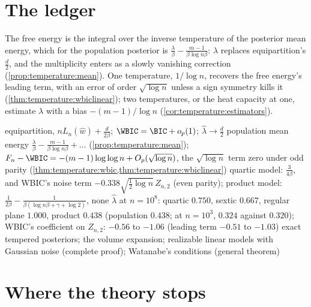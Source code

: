 \begin{refsection}
\section{The ledger}\label{sec:temperature:ledger}

The free energy is the integral over the inverse temperature of the posterior mean energy, which for the population posterior is $\frac\lambda\beta-\frac{m-1}{\beta\log n\beta}$: $\lambda$ replaces equipartition's $\frac d2$, and the multiplicity enters as a slowly vanishing correction (\cref{prop:temperature:mean}). One temperature, $1/\log n$, recovers the free energy's leading term, with an error of order $\sqrt{\log n}$ unless a sign symmetry kills it (\cref{thm:temperature:wbiclinear}); two temperatures, or the heat capacity at one, estimate $\lambda$ with a bias $-(m-1)/\log n$ (\cref{cor:temperature:estimators}).

{equipartition, $nL_n(\hat w)+\frac{d}{2\beta}$; $\WBIC=\BIC+o_p(1)$; $\hat\lambda\to\frac d2$}
{population mean energy $\frac\lambda\beta-\frac{m-1}{\beta\log n\beta}+\dots$ (\cref{prop:temperature:mean}); $F_n-\WBIC=-(m-1)\log\log n+O_p(\sqrt{\log n})$, the $\sqrt{\log n}$ term zero under odd parity (\cref{thm:temperature:wbic,thm:temperature:wbiclinear})}
{quartic model: $\frac3{4\beta}$, and WBIC's noise term $-0.338\sqrt{\frac12\log n}\,Z_{n,2}$ (even parity); product model: $\frac1{2\beta}-\frac1{\beta(\log n\beta+\gamma+\log 2)}$, none}
{$\hat\lambda$ at $n=10^8$: quartic $0.750$, sextic $0.667$, regular plane $1.000$, product $0.438$ (population $0.438$; at $n=10^3$, $0.324$ against $0.320$); WBIC's coefficient on $Z_{n,2}$: $-0.56$ to $-1.06$ (leading term $-0.51$ to $-1.03$)}
{exact tempered posteriors; the volume expansion; realizable linear models with Gaussian noise (complete proof); Watanabe's conditions (general theorem)}

\section{Where the theory stops}\label{sec:temperature:stops}


\end{refsection}
